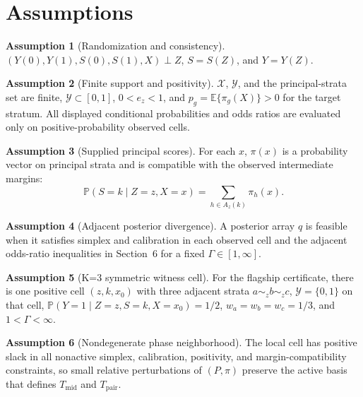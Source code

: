 \documentclass[11pt]{article}
\newcommand{\E}{\mathbb{E}}
\renewcommand{\Pr}{\mathbb{P}}
\theoremstyle{definition}
\newtheorem{assumption}{Assumption}
\theoremstyle{plain}
\theoremstyle{remark}
\begin{document}
\section{Assumptions}
\begin{assumption}[Randomization and consistency]\label{ass:randomization}
\((Y(0),Y(1),S(0),S(1),X)\perp Z\), \(S=S(Z)\), and \(Y=Y(Z)\).
\end{assumption}

\begin{assumption}[Finite support and positivity]\label{ass:positivity}
\(\mathcal X\), \(\mathcal Y\), and the principal-strata set are finite, \(\mathcal Y\subset[0,1]\), \(0<e_z<1\), and \(p_g=\E\{\pi_g(X)\}>0\) for the target stratum.  All displayed conditional probabilities and odds ratios are evaluated only on positive-probability observed cells.
\end{assumption}

\begin{assumption}[Supplied principal scores]\label{ass:principal-scores}
For each \(x\), \(\pi(x)\) is a probability vector on principal strata and is compatible with the observed intermediate margins:
\[
  \Pr(S=k\mid Z=z,X=x)=\sum_{h\in A_z(k)}\pi_h(x).
\]
\end{assumption}

\begin{assumption}[Adjacent posterior divergence]\label{ass:divergence}
A posterior array \(q\) is feasible when it satisfies simplex and calibration in each observed cell and the adjacent odds-ratio inequalities in Section~6 for a fixed \(\Gamma\in[1,\infty]\).
\end{assumption}

\begin{assumption}[K=3 symmetric witness cell]\label{ass:witness-cell}
For the flagship certificate, there is one positive cell \((z,k,x_0)\) with three adjacent strata \(a\sim_z b\sim_z c\), \(\mathcal Y=\{0,1\}\) on that cell, \(\Pr(Y=1\mid Z=z,S=k,X=x_0)=1/2\), \(w_a=w_b=w_c=1/3\), and \(1<\Gamma<\infty\).
\end{assumption}

\begin{assumption}[Nondegenerate phase neighborhood]\label{ass:phase-neighborhood}
The local cell has positive slack in all nonactive simplex, calibration, positivity, and margin-compatibility constraints, so small relative perturbations of \((P,\pi)\) preserve the active basis that defines \(T_{\mathrm{mid}}\) and \(T_{\mathrm{pair}}\).
\end{assumption}
\end{document}
